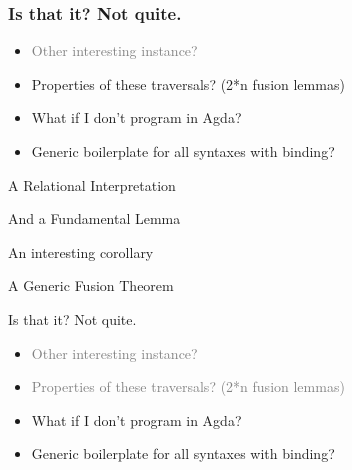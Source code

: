 \documentclass[xetex, mathserif, serif]{beamer}
\begin{document}
  \begin{frame}\frametitle{Is that it? Not quite.}
    \begin{itemize}
      \item \textcolor{gray}{Other interesting instance?}
      \item Properties of these traversals? (2*n fusion lemmas)
      \item What if I don't program in Agda?
      \item Generic boilerplate for all syntaxes with binding?
    \end{itemize}
  \end{frame}

  \begin{frame}{A Relational Interpretation}
    \vspace{-3.5em}
  \end{frame}

  \begin{frame}{And a Fundamental Lemma}
  \end{frame}

  \begin{frame}{An interesting corollary}
  \end{frame}
  
  \begin{frame}{A Generic Fusion Theorem}
    \vspace{-1.8em}
    \vspace{-1.8em}
    \vspace{-1.8em}
    \unskip
  \end{frame}

  \begin{frame}{Is that it? Not quite.}
    \begin{itemize}
      \item \textcolor{gray}{Other interesting instance?}
      \item \textcolor{gray}{Properties of these traversals? (2*n fusion lemmas)}
      \item What if I don't program in Agda?
      \item Generic boilerplate for all syntaxes with binding?
    \end{itemize}
  \end{frame}
\end{document}
